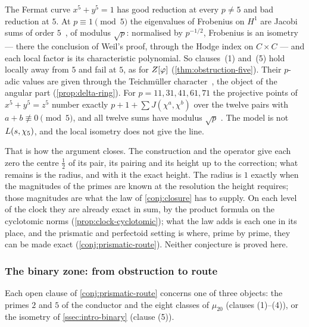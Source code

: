 \begin{remark}\label{rmk:fermat-model}
The Fermat curve $x^5+y^5=1$ has good reduction at every $p\ne5$ and bad reduction at $5$.  At
$p\equiv1\pmod5$ the eigenvalues of Frobenius on $H^1$ are Jacobi sums of order $5$~\cite{weil49}, of
modulus $\sqrt p$: normalised by $p^{-1/2}$, Frobenius is an isometry --- there the conclusion of Weil's
proof, through the Hodge index on $C\times C$ --- and each local factor is its
characteristic polynomial.  So clauses~(1) and~(5) hold locally away from $5$ and fail at $5$, as
for $Z[\varphi]$ (\cref{thm:obstruction-five}).  Their $p$-adic values are given through the Teichm\"uller
character~\cite{grosskoblitz79}, the object of the angular part (\cref{prop:delta-ring}).  For $p=11,31,41,61,71$ the projective points of $x^5+y^5=z^5$ number exactly
$p+1+\sum J(\chi^a,\chi^b)$ over the twelve pairs with $a+b\not\equiv0\pmod5$, and all twelve sums have
modulus $\sqrt p$ .  The model
is not $L(s,\chi_5)$, and the local isometry does not give the line.
\end{remark}

That is how the argument closes.  The construction and the operator give each zero the centre $\tfrac12$ of its pair, its pairing and its height up to the correction; what remains is the radius, and with it the exact
height.  The radius is $1$ exactly when the magnitudes of the primes are known at the resolution the
height requires; those magnitudes are what the law of \cref{conj:closure}
has to supply.  On each level of the clock they are
already exact in sum, by the product formula on the
cyclotomic norms (\cref{prop:clock-cyclotomic}); what
the law adds is each one in its place, and the
prismatic and perfectoid setting is where, prime by
prime, they can be made exact
(\cref{conj:prismatic-route}).  Neither conjecture is
proved here.

\subsubsection{The binary zone: from obstruction to route}\label{ssec:disc-binary}

Each open clause of \cref{conj:prismatic-route} concerns one of three objects: the primes $2$ and $5$ of the conductor and the eight classes of $\mu_{20}$ (clauses (1)--(4)), or the isometry of \cref{ssec:intro-binary} (clause (5)).

